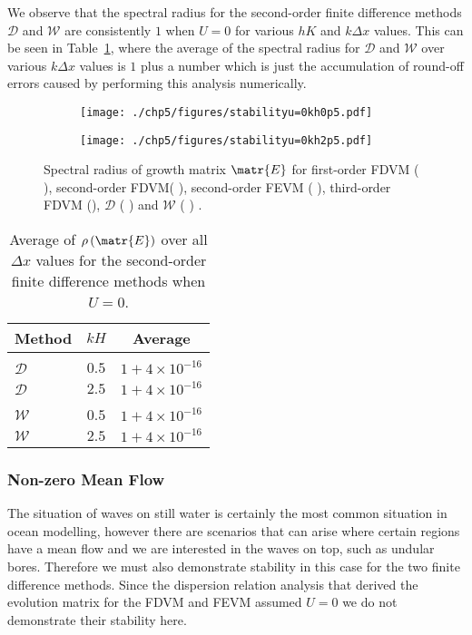 We observe that the spectral radius for the second-order finite difference methods $\mathcal{D}$ and $\mathcal{W}$ are consistently $1$ when $U=0$ for various $hK$ and $
k\Delta x$ values. This can be seen in Table~\ref{tab:Averageofspectralradiusu=0}, where the average of the spectral radius for $\mathcal{D}$ and $\mathcal{W}$ over various $k \Delta x$ values is $1$ plus a number which is just the accumulation of round-off errors caused by performing this analysis numerically.
%
\begin{figure}
	\centering
	\begin{subfigure}{0.5\textwidth}
		\texttt{[image: ./chp5/figures/stabilityu=0kh0p5.pdf]}
	\end{subfigure}%
	\begin{subfigure}{0.5\textwidth}
		\texttt{[image: ./chp5/figures/stabilityu=0kh2p5.pdf]}
	\end{subfigure}
	\caption{Spectral radius of growth matrix $\matr{E}$ for first-order FDVM ({\color{green!60!black} \solidrule}), second-order FDVM({\color{red} \solidrule}), second-order FEVM ({\color{blue} \solidrule}), third-order FDVM ({\solidrule}), $\mathcal{D}$ ({\color{violet!80!white} \solidrule}) and $\mathcal{W}$ ({\color{orange} \solidrule}) .}
	\label{fig:Stabu=0}
\end{figure}
%
\begin{table}
	\centering
	\begin{tabular}{l  c  c}
		\hline
		Method & $kH$& Average\\
		\hline && \\
		$\mathcal{D}$& $0.5$ & $1+ 4\times 10^{-16}$  \\
		$\mathcal{D}$& $2.5$ & $1+ 4\times 10^{-16}$  \\
		\hline \\
		$\mathcal{W}$& $0.5$ & $1+ 4\times 10^{-16}$  \\
		$\mathcal{W}$& $2.5$ & $1+ 4\times 10^{-16}$ \\
		\hline
	\end{tabular}
	\caption{Average of $\rho\left(\matr{E}\right)$ over all $\Delta x$ values for the second-order finite difference methods when $U=0$.}
	\label{tab:Averageofspectralradiusu=0}
\end{table}
\subsubsection{Non-zero Mean Flow} 
The situation of waves on still water is certainly the most common situation in ocean modelling, however there are scenarios that can arise where certain regions have a mean flow and we are interested in the waves on top, such as undular bores. Therefore we must also demonstrate stability in this case for the two finite difference methods. Since the dispersion relation analysis that derived the evolution matrix for the FDVM and FEVM assumed $U=0$ we do not demonstrate their stability here. 

